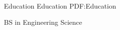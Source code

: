 \Section
{Education}
{Education}
{PDF:Education}

\Entry
\TrinityTitle
\dotfill
\textbf{}
\SubEntry
\Gap
BS in Engineering Science